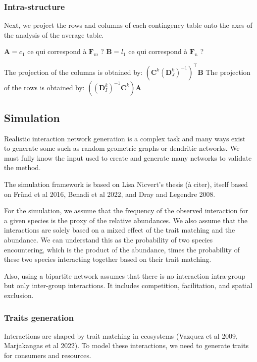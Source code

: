 \subsubsection{Intra-structure}

Next, we project the rows and columns of each contingency table onto the axes of the analysis of the average table.

$\mathbf{A} = c_1$ ce qui correspond à $\mathbf{F}_m$ ?
$\mathbf{B} = l_1$ ce qui correspond à $\mathbf{F}_n$ ?

The  projection of the columns is obtained by: $\left( \mathbf{C}^k (\mathbf{D}_J^k)^{-1} \right)^\intercal\mathbf{B}$
The projection of the rows is obtained by: $\left( (\mathbf{D}_I^k)^{-1}\mathbf{C}^k \right) \mathbf{A}$



\subsection{Simulation}

Realistic interaction network generation is a complex task and many ways exist to generate some such as random geometric graphs or dendritic networks. We must fully know the input used to create and generate many networks to validate the method.

The simulation framework is based on Lisa Nicvert's thesis (à citer), itself based on Fründ et al 2016, Benadi et al 2022, and Dray and Legendre 2008.

For the simulation, we assume that the frequency of the observed interaction for a given species is  the proxy of the relative abundances. We also assume that the interactions are solely based on a mixed effect of the trait matching and the abundance. We can understand this as the probability of two species encountering, which is the product of the abundance, times the probability of these two species interacting together based on their trait matching.

Also, using a bipartite network assumes that there is no interaction intra-group but only inter-group interactions. It includes competition, facilitation, and spatial exclusion.




\subsubsection{Traits generation}

Interactions are shaped by trait matching in ecosystems (Vazquez et al 2009, Marjakangas et al 2022). To model these interactions, we need to generate traits for consumers and resources.

